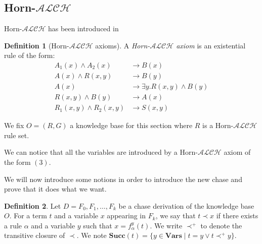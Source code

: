 \documentclass{article}
\theoremstyle{definition}
\newtheorem{definition}{Definition}[section]
\theoremstyle{remark}
\newcommand{\Vars}{\textbf{Vars}}
\newcommand{\su}{\textbf{Succ}}
\begin{document}
\subsection{Horn-$\mathcal{ALCH}$ }

Horn-$\mathcal{ALCH}$ has been introduced in \cite{Horn-ALC}

\begin{definition}[Horn-$\mathcal{ALCH}$ axioms]
A \emph{Horn-$\mathcal{ALCH}$ axiom} is an existential rule of the form:
\begin{align}
A_1(x) \wedge A_2(x) &\rightarrow B(x) \\
A(x) \wedge R(x,y) &\rightarrow B(y) \\
A(x) &\rightarrow \exists y.R(x,y) \wedge B(y) \\
R(x,y) \wedge B(y) &\rightarrow A(x) \\
R_1(x,y) \wedge R_2(x,y) &\rightarrow S(x,y)
\end{align}

\end{definition}


We fix $O=(R,G)$ a knowledge base for this section where $R$ is a Horn-$\mathcal{ALCH}$ rule set.

We can notice that all the variables are introduced by a Horn-$\mathcal{ALCH}$ axiom of the form $(3)$.

We will now introduce some notions in order to introduce the new chase and prove that it does what we want.

\begin{definition}
Let $D = F_0,F_1,\ldots,F_k$ be a chase derivation of the knowledge base $O$. For a term $t$ and a variable $x$ appearing in $F_k$, we say that $t \prec x$ if there exists a rule $\alpha$ and a variable $y$ such that $x= f_\alpha^y(t)$.
We write $\prec^+$ to denote the transitive closure of $\prec$. We note \emph{$\su(t)$}$= \{y \in \Vars \mid t = y \vee t \prec^+ y\}$.
\end{definition}
\end{document}
